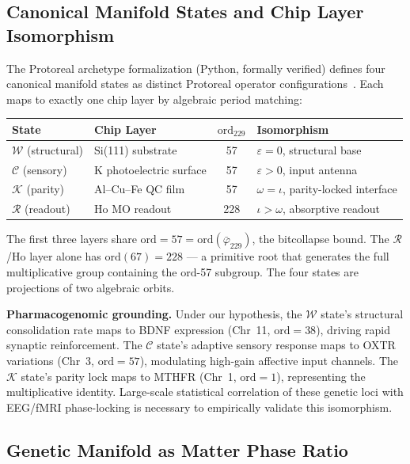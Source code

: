 \subsection{Canonical Manifold States and Chip Layer Isomorphism}

The Protoreal archetype formalization (Python, formally verified) defines four canonical manifold states as distinct Protoreal operator configurations~\cite{lc}. Each maps to exactly one chip layer by algebraic period matching:

\begin{center}
\begin{tabular}{@{}llcl@{}}
\toprule
\textbf{State} & \textbf{Chip Layer} & $\mathrm{ord}_{229}$ & \textbf{Isomorphism} \\
\midrule
$\mathcal{W}$ (structural) & Si(111) substrate & 57 & $\varepsilon = 0$, structural base \\
$\mathcal{C}$ (sensory) & K photoelectric surface & 57 & $\varepsilon > 0$, input antenna \\
$\mathcal{K}$ (parity) & Al--Cu--Fe QC film & 57 & $\omega = \iota$, parity-locked interface \\
$\mathcal{R}$ (readout) & Ho MO readout & 228 & $\iota > \omega$, absorptive readout \\
\bottomrule
\end{tabular}
\end{center}

\noindent The first three layers share $\mathrm{ord} = 57 = \mathrm{ord}(\bar\varphi_{229})$, the bitcollapse bound. The $\mathcal{R}$/Ho layer alone has $\mathrm{ord}(67) = 228$ --- a primitive root that generates the full multiplicative group containing the $\mathrm{ord}$-57 subgroup. The four states are projections of two algebraic orbits.

\textbf{Pharmacogenomic grounding.} Under our hypothesis, the $\mathcal{W}$ state's structural consolidation rate maps to BDNF expression (Chr~11, $\mathrm{ord} = 38$), driving rapid synaptic reinforcement. The $\mathcal{C}$ state's adaptive sensory response maps to OXTR variations (Chr~3, $\mathrm{ord} = 57$), modulating high-gain affective input channels. The $\mathcal{K}$ state's parity lock maps to MTHFR (Chr~1, $\mathrm{ord} = 1$), representing the multiplicative identity. Large-scale statistical correlation of these genetic loci with EEG/fMRI phase-locking is necessary to empirically validate this isomorphism.

\subsection{Genetic Manifold as Matter Phase Ratio}

